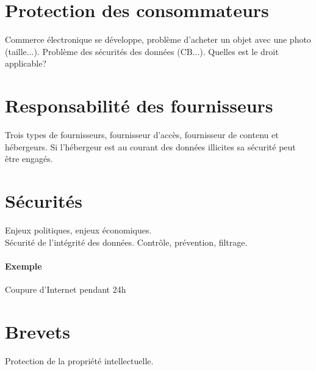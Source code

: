 \documentclass{article}
\begin{document}
	\section{Protection des consommateurs}
		Commerce électronique se développe,	problème d'acheter un objet avec 
		une photo (taille...). Problème des sécurités des données (CB...).
		Quelles est le droit applicable? 
	\section{Responsabilité des fournisseurs}
	Trois types de fournisseurs, fournisseur d'accès, fournisseur de contenu et
	hébergeurs. Si l'hébergeur est au courant des données illicites sa sécurité 
	peut être engagés.
	\section{Sécurités}
	Enjeux politiques, enjeux économiques.\\
	Sécurité de l'intégrité des données. Contrôle, prévention, filtrage.
	\paragraph{Exemple}Coupure d'Internet pendant 24h
	\section{Brevets}		
	Protection de la propriété intellectuelle. 
\end{document}
